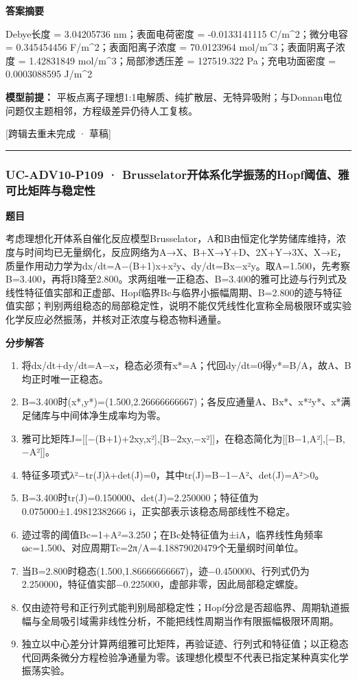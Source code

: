 \documentclass[UTF8,11pt,a4paper]{ctexart}
\begin{document}
\noindent\textbf{答案摘要}\par
Debye长度 = 3.04205736 nm；表面电荷密度 = -0.0133141115 C/m\textasciicircum{}2；微分电容 = 0.345454456 F/m\textasciicircum{}2；表面阳离子浓度 = 70.0123964 mol/m\textasciicircum{}3；表面阴离子浓度 = 1.42831849 mol/m\textasciicircum{}3；局部渗透压差 = 127519.322 Pa；充电功面密度 = 0.0003088595 J/m\textasciicircum{}2\par
\noindent\textbf{模型前提：}
平板点离子理想1:1电解质、纯扩散层、无特异吸附；与Donnan电位问题仅主题相邻，方程级差异仍待人工复核。\par
\noindent\textcolor{red!65!black}{[跨辑去重未完成 · 草稿]} \par
\medskip\hrule\medskip
{}
\subsubsection*{UC-ADV10-P109 · Brusselator开体系化学振荡的Hopf阈值、雅可比矩阵与稳定性}
\noindent\textbf{题目}\par
考虑理想化开体系自催化反应模型Brusselator，A和B由恒定化学势储库维持，浓度与时间均已无量纲化，反应网络为A→X、B+X→Y+D、2X+Y→3X、X→E，质量作用动力学为dx/dt=A−(B+1)x+x²y、dy/dt=Bx−x²y。取A=1.500，先考察B=3.400，再将B降至2.800。求两组唯一正稳态、B=3.400的雅可比迹与行列式及线性特征值实部和正虚部、Hopf临界Bc与临界小振幅周期、B=2.800的迹与特征值实部；判别两组稳态的局部稳定性，说明不能仅凭线性化宣称全局极限环或实验化学反应必然振荡，并核对正浓度与稳态物料通量。\par
\medskip\noindent\textbf{分步解答}
\begin{enumerate}
\item 将dx/dt+dy/dt=A−x，稳态必须有x*=A；代回dy/dt=0得y*=B/A，故A、B均正时唯一正稳态。
\item B=3.400时(x*,y*)=(1.500,2.26666666667)；各反应通量A、Bx*、x*²y*、x*满足储库与中间体净生成率均为零。
\item 雅可比矩阵J=[[−(B+1)+2xy,x²],[B−2xy,−x²]]，在稳态简化为[[B−1,A²],[−B,−A²]]。
\item 特征多项式λ²−tr(J)λ+det(J)=0，其中tr(J)=B−1−A²、det(J)=A²>0。
\item B=3.400时tr(J)=0.150000、det(J)=2.250000；特征值为0.075000±1.49812382666 i，正实部表示该稳态局部线性不稳定。
\item 迹过零的阈值Bc=1+A²=3.250；在Bc处特征值为±iA，临界线性角频率ωc=1.500、对应周期Tc=2π/A=4.18879020479个无量纲时间单位。
\item 当B=2.800时稳态(1.500,1.86666666667)，迹−0.450000、行列式仍为2.250000，特征值实部−0.225000，虚部非零，因此局部稳定螺旋。
\item 仅由迹符号和正行列式能判别局部稳定性；Hopf分岔是否超临界、周期轨道振幅与全局吸引域需非线性分析，不能把线性周期当作有限振幅极限环周期。
\item 独立以中心差分计算两组雅可比矩阵，再验证迹、行列式和特征值；以正稳态代回两条微分方程检验净通量为零。该理想化模型不代表已指定某种真实化学振荡实验。
\end{enumerate}
\end{document}
